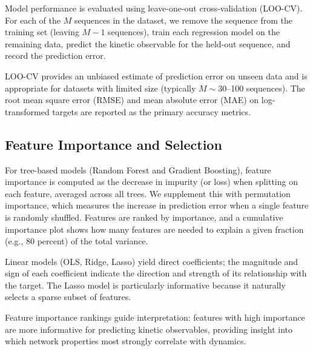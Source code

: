 Model performance is evaluated using leave-one-out cross-validation (LOO-CV). For
each of the $M$ sequences in the dataset, we remove the sequence from the training set
(leaving $M-1$ sequences), train each regression model on the remaining data, predict
the kinetic observable for the held-out sequence, and record the prediction error.

LOO-CV provides an unbiased estimate of prediction error on unseen data and is
appropriate for datasets with limited size (typically $M \sim 30$--100 sequences). The
root mean square error (RMSE) and mean absolute error (MAE) on log-transformed targets
are reported as the primary accuracy metrics.


\subsection{Feature Importance and Selection}\label{subsec:importance}

For tree-based models (Random Forest and Gradient Boosting), feature importance is
computed as the decrease in impurity (or loss) when splitting on each feature, averaged
across all trees. We supplement this with permutation importance, which measures the
increase in prediction error when a single feature is randomly shuffled. Features are
ranked by importance, and a cumulative importance plot shows how many features are needed
to explain a given fraction (e.g., 80 percent) of the total variance.

Linear models (OLS, Ridge, Lasso) yield direct coefficients; the magnitude and sign of
each coefficient indicate the direction and strength of its relationship with the target.
The Lasso model is particularly informative because it naturally selects a sparse subset
of features.

Feature importance rankings guide interpretation: features with high importance are more
informative for predicting kinetic observables, providing insight into which network
properties most strongly correlate with dynamics.


